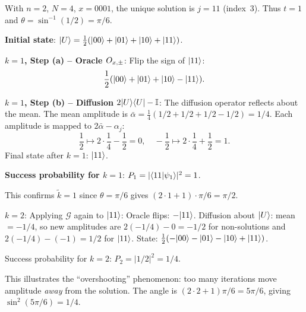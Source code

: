 \documentclass[12pt,oneside]{amsart}
\begin{document}
\begin{exercise}
\end{exercise}
\begin{solution}
  With $n=2$, $N=4$, $x=0001$, the unique solution is $j=11$ (index~3).
  Thus $t=1$ and $\theta=\sin^{-1}(1/2)=\pi/6$.

  \textbf{Initial state}: $|U\rangle = \frac{1}{2}(|00\rangle+|01\rangle+|10\rangle+|11\rangle)$.

  \textbf{$k=1$, Step (a) -- Oracle $O_{x,\pm}$}: Flip the sign of $|11\rangle$:
  \[
    \frac{1}{2}(|00\rangle+|01\rangle+|10\rangle-|11\rangle).
  \]

  \textbf{$k=1$, Step (b) -- Diffusion $2|U\rangle\langle U|-\mathbb{I}$}:
  The diffusion operator reflects about the mean.  The mean amplitude is
  $\bar{\alpha} = \frac{1}{4}(1/2+1/2+1/2-1/2) = 1/4$.
  Each amplitude is mapped to $2\bar{\alpha}-\alpha_j$:
  \[
    \frac{1}{2} \mapsto 2\cdot\frac{1}{4}-\frac{1}{2} = 0, \quad
    -\frac{1}{2} \mapsto 2\cdot\frac{1}{4}+\frac{1}{2} = 1.
  \]
  Final state after $k=1$: $|11\rangle$.

  \textbf{Success probability for $k=1$}: $P_1 = |\langle11|\psi_1\rangle|^2 = 1$.

  This confirms $\widetilde{k}=1$ since $\theta=\pi/6$ gives
  $(2\cdot 1+1)\cdot\pi/6 = \pi/2$.

  \textbf{$k=2$}: Applying $\mathcal{G}$ again to $|11\rangle$:
  Oracle flips: $-|11\rangle$.  Diffusion about $|U\rangle$:
  mean $= -1/4$, so new amplitudes are $2(-1/4)-0=-1/2$ for non-solutions
  and $2(-1/4)-(-1) = 1/2$ for $|11\rangle$.
  State: $\frac{1}{2}(-|00\rangle-|01\rangle-|10\rangle+|11\rangle)$.

  Success probability for $k=2$: $P_2 = |1/2|^2 = 1/4$.

  This illustrates the ``overshooting'' phenomenon: too many iterations move
  amplitude \emph{away} from the solution. The angle is
  $(2\cdot 2+1)\pi/6 = 5\pi/6$, giving $\sin^2(5\pi/6)=1/4$.
\end{solution}
\end{document}
